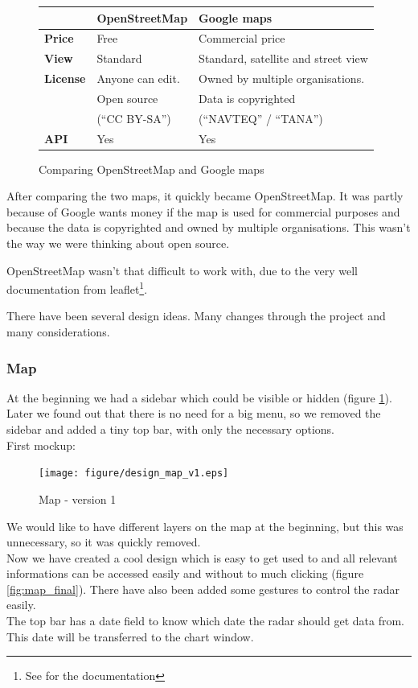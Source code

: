 \begin{figure}[htbp]
\begin{tabular}{| l | l | l |}
\hline
& \textbf{OpenStreetMap} & \textbf{Google maps} \\
\hline
\textbf{Price} & Free & Commercial price \\
\hline
\textbf{View} & Standard & Standard, satellite and street view \\
\hline
\multirow{1}{*}{\textbf{License}} & Anyone can edit. & Owned by multiple organisations.  \\ & Open source & Data is copyrighted \\ & (``CC BY-SA'') & (``NAVTEQ'' / ``TANA'') \\
\hline
\textbf{API} & Yes & Yes \\
\hline
\end{tabular}
\caption{Comparing OpenStreetMap and Google maps}
\end{figure}

After comparing the two maps, it quickly became OpenStreetMap. It was partly because of Google wants money if the map is used for commercial purposes and because the data is copyrighted and owned by multiple organisations. This wasn't the way we were thinking about open source.

OpenStreetMap wasn't that difficult to work with, due to the very well documentation from leaflet\footnote{See \cite{leaflet} for the documentation}.

There have been several design ideas. Many changes through the project and many considerations.
\subsubsection{Map}
At the beginning we had a sidebar which could be visible or hidden (figure \ref{fig:map_v1}). Later we found out that there is no need for a big menu, so we removed the sidebar and added a tiny top bar, with only the necessary options.\\
First mockup:
\begin{figure}[htbp]
   \centering
   \texttt{[image: figure/design\_map\_v1.eps]}
   \caption{Map - version 1}
   \label{fig:map_v1}
\end{figure}

We would like to have different layers on the map at the beginning, but this was unnecessary, so it was quickly removed.\\
Now we have created a cool design which is easy to get used to and all relevant informations can be accessed easily and without to much clicking (figure \ref{fig:map_final}).
There have also been added some gestures to control the radar easily.\\
The top bar has a date field to know which date the radar should get data from. This date will be transferred to the chart window.


